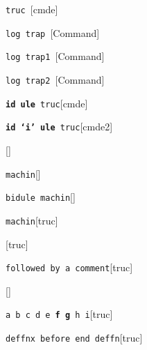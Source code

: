 \documentclass{book}
\begin{document}
\begin{titlepage}
%
%
\noindent\texttt\bgroup{}truc \egroup{}\hfill[cmde]



%
\noindent\texttt\bgroup{}log trap \egroup{}\hfill[Command]



%
\noindent\texttt\bgroup{}log trap1 \egroup{}\hfill[Command]



%
\noindent\texttt\bgroup{}log trap2 \egroup{}\hfill[Command]



%
\noindent\texttt\bgroup{}\textbf{id ule} truc\egroup{}\hfill[cmde]



%
\noindent\texttt\bgroup{}\textbf{id `\texttt{i}' ule} truc\egroup{}\hfill[cmde2]



%
\noindent\texttt\bgroup{}\egroup{}\hfill[]



\noindent\texttt\bgroup{}machin\egroup{}\hfill[]



%
\noindent\texttt\bgroup{}bidule machin\egroup{}\hfill[]



%
\noindent\texttt\bgroup{}machin\egroup{}\hfill[truc]



%
\noindent\texttt\bgroup{}\egroup{}\hfill[truc]



\noindent\texttt\bgroup{}followed by a comment\egroup{}\hfill[truc]



%
\noindent\texttt\bgroup{}\egroup{}\hfill[]



\noindent\texttt\bgroup{}a b c d e \textbf{f g} h i\egroup{}\hfill[truc]



%
\noindent\texttt\bgroup{}deffnx before end deffn\egroup{}\hfill[truc]




\end{titlepage}
\end{document}
